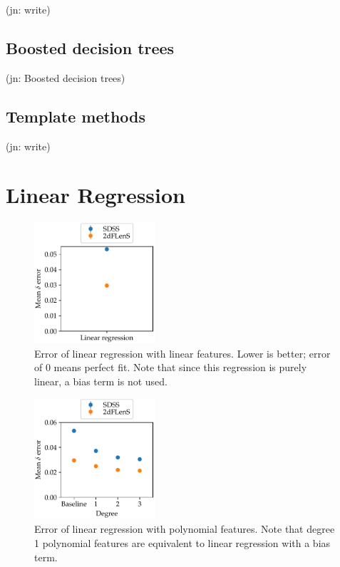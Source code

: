 \documentclass[11pt,twoside]{report}
\newcommand\jn[1]{{\color{red}(jn: #1)}}
\begin{document}
\jn{write}

\subsection{Boosted decision trees}

\jn{Boosted decision trees}

\subsection{Template methods}

\jn{write}

\section{Linear Regression}

  \begin{figure}
    \centering
    \includegraphics[width=0.4\textwidth]{linreg_plain.pdf}
    \caption{Error of linear regression with linear features. Lower is better; error of $0$ means perfect fit. Note that since this regression is purely linear, a bias term is not used.}
    \label{fig:linreg_plain}
  \end{figure}

  \begin{figure}
    \centering
    \includegraphics[width=0.4\textwidth]{linreg_polynomial.pdf}
    \caption{Error of linear regression with polynomial features. Note that degree 1 polynomial features are equivalent to linear regression with a bias term.}
    \label{fig:linreg_polynomial}
  \end{figure}
\end{document}
